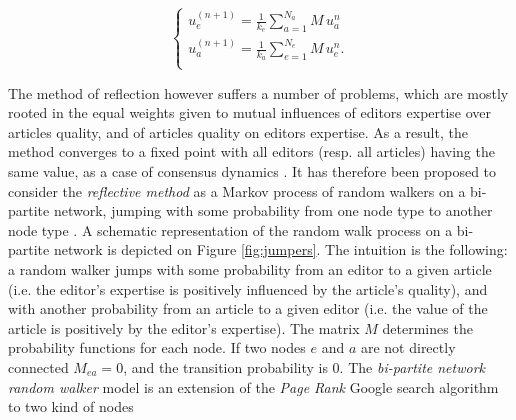 \begin{equation}
\begin{cases}
 u_{e}^{(n+1)} = \frac{1}{k_{e}}\sum_{a=1}^{N_{a}} M \, u_{a}^{n}\\[7pt]
 u_{a}^{(n+1)} = \frac{1}{k_{a}}\sum_{e=1}^{N_{e}} M \, u_{e}^{n}.\\
\end{cases}
\label{HHhigher}
\end{equation}

The method of reflection however suffers a number of problems, which are mostly rooted in the equal weights given to mutual influences of editors expertise over articles quality, and of articles quality on editors expertise. As a result, the method converges to a fixed point with all editors (resp. all articles) having the same value, as a case of consensus dynamics \cite{caldarelli2012network}. It has therefore been proposed to consider the {\it reflective method} as a Markov process of random walkers on a bi-partite network, jumping with some probability from one node type to another node type \cite{caldarelli2012network}. A schematic representation of the random walk process on a bi-partite network is depicted on Figure \ref{fig:jumpers}. The intuition is the following: a random walker jumps with some probability from an editor to a given article (i.e. the editor's expertise is positively influenced by the article's quality), and with another probability from an article to a given editor (i.e. the value of the article is positively by the editor's expertise). The matrix $M$ determines the probability functions for each node. If two nodes $e$ and $a$ are not directly connected $M_{ea} = 0$, and the transition probability is 0. The {\it bi-partite network random walker} model is an extension of the {\it Page Rank} Google search algorithm \cite{page1999pagerank} to two kind of nodes 

